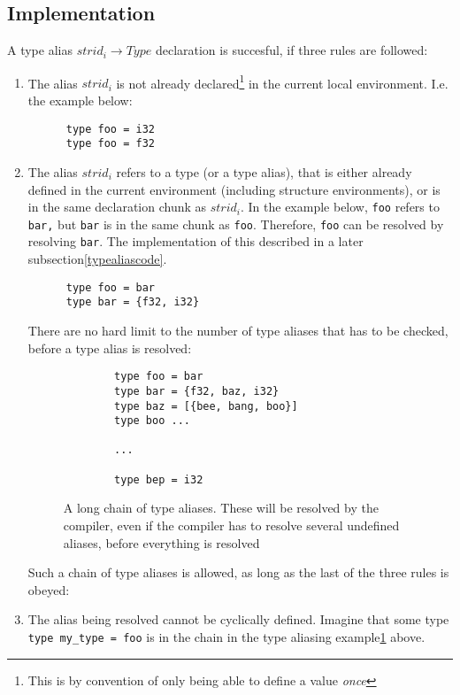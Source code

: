 \subsection{Implementation}\label{typealiasimplementation}
A type alias $strid_i \to Type$ declaration is succesful, if three rules are followed:
\begin{enumerate}
  \item The alias $strid_i$ is not already declared\footnote{This is by convention of
      only being able to define a value \textit{once}} in the current local
    environment. I.e. the example below:
    \begin{verbatim}
      type foo = i32
      type foo = f32
    \end{verbatim}
  \item The alias $strid_i$ refers to a type (or a type alias), that is either already
    defined in the current environment (including structure environments), or is
    in the same declaration chunk as $strid_i$. In the example below, \texttt{foo} refers
    to \texttt{bar,} but \texttt{bar} is in the same chunk as \texttt{foo}.
    Therefore, \texttt{foo} can be resolved by resolving \texttt{bar}. The implementation of this
    described in a later subsection\ref{typealiascode}.
    \begin{verbatim} 
      type foo = bar
      type bar = {f32, i32}
    \end{verbatim}
    There are no hard limit to the number of type aliases that has to be
    checked, before a type alias is resolved:
    \begin{figure}\label{longchain}
      \begin{verbatim} 
        type foo = bar
        type bar = {f32, baz, i32}
        type baz = [{bee, bang, boo}]
        type boo ...
  
        ...
  
        type bep = i32
        \end{verbatim}
      \caption{A long chain of type aliases. These will be resolved by the
        compiler, even if the compiler has to resolve several undefined aliases,
      before everything is resolved}
    \end{figure}
    Such a chain of type aliases is allowed, as long as the last of the three
    rules is obeyed:
  
    
  \item The alias being resolved cannot be cyclically defined.\label{cyclicaldefinitionerror}
    Imagine that some type \texttt{type my\_type = foo} is in the chain in the
    type aliasing example\ref{longchain} above.\\


\end{enumerate}
